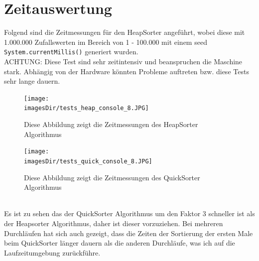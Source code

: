 \documentclass[11pt, a4paper, twoside]{article}   	%
\newcommand{\imagesDir}{images}
\newcommand{\inlinecode}{\lstinline[style=inlineSource]}
\begin{document}
\newpage
{\color{myred}
	\section
		{Zeitauswertung}
}
Folgend sind die Zeitmessungen für den HeapSorter angeführt, wobei diese mit 1.000.000 Zufallswerten im Bereich von 1 - 100.000 mit einem seed \inlinecode|System.currentMillis()| generiert wurden.\\
{\color{myred}
ACHTUNG: Diese Test sind sehr zeitintensiv und beanspruchen die Maschine stark. Abhängig von der Hardware könnten Probleme auftreten bzw. diese Tests sehr lange dauern.
}
\begin{figure}[h]
  \centering
  \texttt{[image: \\imagesDir/tests\_heap\_console\_8.JPG]}
  \caption
   {Diese Abbildung zeigt die Zeitmessungen des HeapSorter Algorithmus}
\end{figure}
\begin{figure}[h]
  \centering
  \texttt{[image: \\imagesDir/tests\_quick\_console\_8.JPG]}
  \caption
   {Diese Abbildung zeigt die Zeitmessungen des QuickSorter Algorithmus}
\end{figure}
\\
Es ist zu sehen das der QuickSorter Algorithmus um den Faktor 3 schneller ist als der Heapsorter Algorithmus, daher ist dieser vorzuziehen. Bei mehreren Durchläufen hat sich auch gezeigt, dass die Zeiten der Sortierung der ersten Male beim QuickSorter länger dauern als die anderen Durchläufe, was ich auf die Laufzeitumgebung zurückführe.
\end{document}
